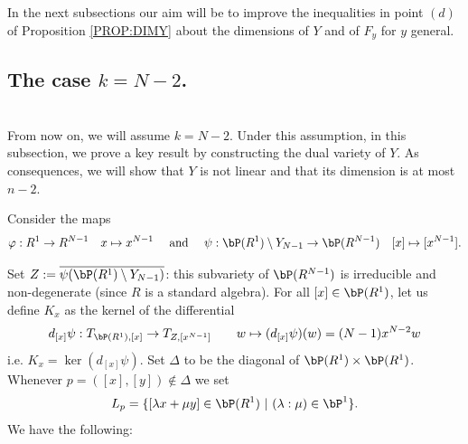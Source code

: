 \documentclass[a4paper,11pt]{amsart}
\begin{document}
In the next subsections our aim will be to improve the inequalities in point $(d)$ of Proposition \ref{PROP:DIMY} about the dimensions of $Y$ and of $F_y$ for $y$ general.


\subsection{The case $k=N-2$.}
\label{SUBSEC:N-2}
$\,$\\

From now on, we will assume $k=N-2$. Under this assumption, in this subsection, we prove a key result by constructing the dual variety of $Y$. As consequences, we will show that $Y$ is not linear and that its dimension is at most $n-2$. 
\vspace{2mm}

Consider the maps
$$\varphi:R^1\to R^{N-1} \quad x \mapsto x^{N-1}\quad \mbox{ and }\quad \psi:\bP(R^1)\setminus Y_{N-1}\to \bP(R^{N-1}) \quad [x] \mapsto [x^{N-1}].$$ 

Set $Z:=\overline{\psi(\bP(R^1)\setminus Y_{N-1})}$: this subvariety of $\bP(R^{N-1})$ is irreducible and non-degenerate (since $R$ is a standard algebra). For all $[x]\in\bP(R^1)$, let us define $K_x$ as the kernel of the differential
$$d_{[x]}\psi:T_{\bP(R^1),[x]}\rightarrow T_{Z,[x^{N-1}]}\qquad w\mapsto (d_{[x]}\psi)(w)=(N-1)x^{N-2}w$$
i.e. $K_x=\ker(d_{[x]}\psi)$. 
Set $\Delta$ to be the diagonal of $\bP(R^1)\times \bP(R^1)$. Whenever $p=([x],[y])\not \in \Delta$ we set 
\begin{equation}
L_p=\{[\lambda x+\mu y]\in \bP(R^1) \ | \ (\lambda:\mu)\in\bP^1\}.
\end{equation}
We have the following:
\end{document}
